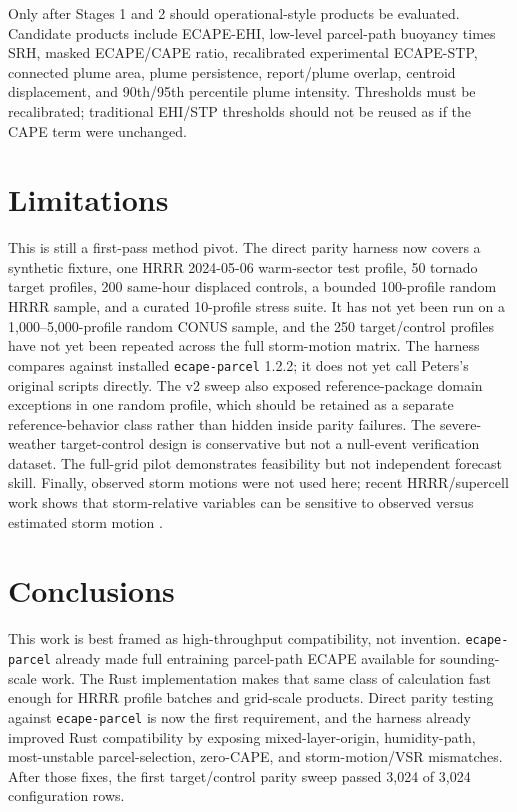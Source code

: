 \documentclass[11pt]{article}
\begin{document}
Only after Stages 1 and 2 should operational-style products be evaluated. Candidate products include ECAPE-EHI, low-level parcel-path buoyancy times SRH, masked ECAPE/CAPE ratio, recalibrated experimental ECAPE-STP, connected plume area, plume persistence, report/plume overlap, centroid displacement, and 90th/95th percentile plume intensity. Thresholds must be recalibrated; traditional EHI/STP thresholds should not be reused as if the CAPE term were unchanged.

\section{Limitations}

This is still a first-pass method pivot. The direct parity harness now covers a synthetic fixture, one HRRR 2024-05-06 warm-sector test profile, 50 tornado target profiles, 200 same-hour displaced controls, a bounded 100-profile random HRRR sample, and a curated 10-profile stress suite. It has not yet been run on a 1,000--5,000-profile random CONUS sample, and the 250 target/control profiles have not yet been repeated across the full storm-motion matrix. The harness compares against installed \texttt{ecape-parcel} 1.2.2; it does not yet call Peters's original scripts directly. The v2 sweep also exposed reference-package domain exceptions in one random profile, which should be retained as a separate reference-behavior class rather than hidden inside parity failures. The severe-weather target-control design is conservative but not a null-event verification dataset. The full-grid pilot demonstrates feasibility but not independent forecast skill. Finally, observed storm motions were not used here; recent HRRR/supercell work shows that storm-relative variables can be sensitive to observed versus estimated storm motion \cite{coffer2025gridrad}.

\section{Conclusions}

This work is best framed as high-throughput compatibility, not invention. \texttt{ecape-parcel} already made full entraining parcel-path ECAPE available for sounding-scale work. The Rust implementation makes that same class of calculation fast enough for HRRR profile batches and grid-scale products. Direct parity testing against \texttt{ecape-parcel} is now the first requirement, and the harness already improved Rust compatibility by exposing mixed-layer-origin, humidity-path, most-unstable parcel-selection, zero-CAPE, and storm-motion/VSR mismatches. After those fixes, the first target/control parity sweep passed 3,024 of 3,024 configuration rows.
\end{document}
